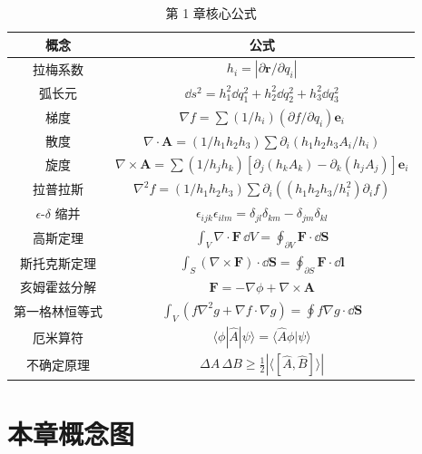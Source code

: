 \begin{table}[h]
\centering
\caption{第 1 章核心公式}
\begin{tabular}{c|c}
\toprule
概念 & 公式 \\
\midrule
拉梅系数 & $h_i = |\partial\mathbf{r}/\partial q_i|$ \\
弧长元 & $\dd s^2 = h_1^2\dd q_1^2 + h_2^2\dd q_2^2 + h_3^2\dd q_3^2$ \\
梯度 & $\nabla f = \sum (1/h_i)(\partial f/\partial q_i)\mathbf{e}_i$ \\
散度 & $\nabla\cdot\mathbf{A} = (1/h_1h_2h_3)\sum\partial_i(h_1h_2h_3A_i/h_i)$ \\
旋度 & $\nabla\times\mathbf{A} = \sum (1/h_jh_k)[\partial_j(h_kA_k)-\partial_k(h_jA_j)]\mathbf{e}_i$ \\
拉普拉斯 & $\nabla^2 f = (1/h_1h_2h_3)\sum\partial_i((h_1h_2h_3/h_i^2)\partial_i f)$ \\
$\epsilon$-$\delta$ 缩并 & $\epsilon_{ijk}\epsilon_{ilm} = \delta_{jl}\delta_{km} - \delta_{jm}\delta_{kl}$ \\
高斯定理 & $\int_V\nabla\cdot\mathbf{F}\,\dd V = \oint_{\partial V}\mathbf{F}\cdot\dd\mathbf{S}$ \\
斯托克斯定理 & $\int_S(\nabla\times\mathbf{F})\cdot\dd\mathbf{S} = \oint_{\partial S}\mathbf{F}\cdot\dd\mathbf{l}$ \\
亥姆霍兹分解 & $\mathbf{F} = -\nabla\phi + \nabla\times\mathbf{A}$ \\
第一格林恒等式 & $\int_V(f\nabla^2g + \nabla f\cdot\nabla g) = \oint f\nabla g\cdot\dd\mathbf{S}$ \\
厄米算符 & $\langle\phi|\hat{A}|\psi\rangle = \langle\hat{A}\phi|\psi\rangle$ \\
不确定原理 & $\Delta A\,\Delta B \geq \frac12|\langle[\hat{A},\hat{B}]\rangle|$ \\
\bottomrule
\end{tabular}
\end{table}

\section{本章概念图}

\begin{center}
\end{center}

